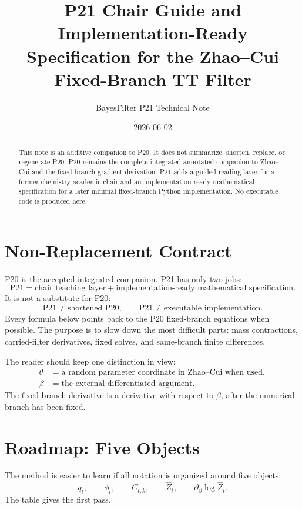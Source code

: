 \documentclass[11pt]{article}
\title{P21 Chair Guide and Implementation-Ready Specification for the Zhao--Cui Fixed-Branch TT Filter}
\author{BayesFilter P21 Technical Note}
\date{2026-06-02}
\newcommand{\widehatZ}{\widehat Z}
\begin{document}
\maketitle

\begin{abstract}
This note is an additive companion to P20.  It does not summarize, shorten,
replace, or regenerate P20.  P20 remains the complete integrated annotated
companion to Zhao--Cui and the fixed-branch gradient derivation.  P21 adds a
guided reading layer for a former chemistry academic chair and an
implementation-ready mathematical specification for a later minimal
fixed-branch Python implementation.  No executable code is produced here.
\end{abstract}

\tableofcontents

\section{Non-Replacement Contract}

P20 is the accepted integrated companion.  P21 has only two jobs:
\[
    \text{P21}
    =
    \text{chair teaching layer}
    +
    \text{implementation-ready mathematical specification}.
    \tag{P21-0}
\]
It is not a substitute for P20:
\[
    \text{P21}\ne
    \text{shortened P20},
    \qquad
    \text{P21}\ne
    \text{executable implementation}.
    \tag{P21-1}
\]
Every formula below points back to the P20 fixed-branch equations when
possible.  The purpose is to slow down the most difficult parts: mass
contractions, carried-filter derivatives, fixed solves, and same-branch finite
differences.

The reader should keep one distinction in view:
\[
\begin{aligned}
    \theta
    &=
    \text{a random parameter coordinate in Zhao--Cui when used},\\
    \beta
    &=
    \text{the external differentiated argument}.
\end{aligned}
    \tag{P21-2}
\]
The fixed-branch derivative is a derivative with respect to \(\beta\), after
the numerical branch has been fixed.

\section{Roadmap: Five Objects}

The method is easier to learn if all notation is organized around five objects:
\[
    q_t,\qquad \phi_t,\qquad C_{t,k},\qquad \widehatZ_t,
    \qquad \partial_\beta\log\widehatZ_t .
    \tag{P21-3}
\]
The table gives the first pass.
\end{document}

